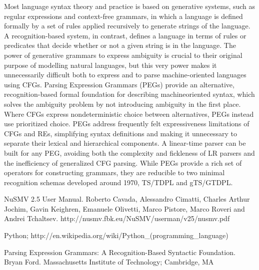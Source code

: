 \documentclass[titlepage, 10pt]{article}
\begin{document}
Most language syntax theory and practice is based on generative
systems, such as regular expressions and context-free grammars, in
which a language is defined formally by a set of rules applied recursively
to generate strings of the language. A recognition-based
system, in contrast, defines a language in terms of rules or predicates
that decide whether or not a given string is in the language.
The power of generative grammars to express
ambiguity is crucial to their original purpose of modelling
natural languages, but this very power makes it unnecessarily difficult
both to express and to parse machine-oriented languages using
CFGs. Parsing Expression Grammars (PEGs) provide an alternative,
recognition-based formal foundation for describing machineoriented
syntax, which solves the ambiguity problem by not introducing
ambiguity in the first place. Where CFGs express nondeterministic
choice between alternatives, PEGs instead use prioritized
choice. PEGs address frequently felt expressiveness limitations of
CFGs and REs, simplifying syntax definitions and making it unnecessary
to separate their lexical and hierarchical components. A
linear-time parser can be built for any PEG, avoiding both the complexity
and fickleness of LR parsers and the inefficiency of generalized
CFG parsing. While PEGs provide a rich set of operators for
constructing grammars, they are reducible to two minimal recognition
schemas developed around 1970, TS/TDPL and gTS/GTDPL.\cite{PEG}





\newpage %

\begin{thebibliography}{99}

 NuSMV 2.5 User Manual. Roberto Cavada, Alessandro Cimatti, Charles Arthur Jochim, Gavin Keighren,
Emanuele Olivetti, Marco Pistore, Marco Roveri and Andrei Tchaltsev. http://nusmv.fbk.eu/NuSMV/userman/v25/nusmv.pdf

 Python; http://en.wikipedia.org/wiki/Python\_(programming\_language)

 Parsing Expression Grammars: A Recognition-Based Syntactic Foundation. Bryan Ford. Massachusetts Institute of Technology; Cambridge, MA

\end{thebibliography}
\end{document}
